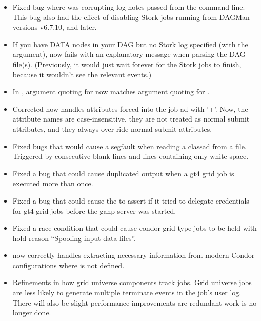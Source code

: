 \begin{itemize}
\item Fixed bug where  was corrupting log notes passed from the
command line.  This bug also had the effect of disabling Stork jobs running
from DAGMan versions v6.7.10, and later.

\item If you have DATA nodes in your DAG but no Stork log specified
(with the  argument),
 now fails with an explanatory message when parsing
the DAG file(s). (Previously, it would just wait forever for the Stork
jobs to finish, because it wouldn't see the relevant events.)

\item In , argument quoting for  now matches
argument quoting for .

\item Corrected how  handles attributes forced into the
job ad with '+'. Now, the attribute names are case-insensitive, they 
are not treated as normal submit attributes, and they always over-ride 
normal submit attributes.

\item Fixed bugs that would cause a segfault when reading a classad from
a file. Triggered by consecutive blank lines and lines containing only
white-space.

\item Fixed a bug that could cause duplicated output when a gt4 grid job 
is executed more than once.

\item Fixed a bug that could cause the  to assert if 
it tried to delegate credentials for gt4 grid jobs before the gahp server 
was started.

\item Fixed a race condition that could cause condor grid-type jobs to be
held with hold reason ``Spooling input data files''.

\item {} now correctly handles extracting necessary
information from modern Condor configurations where
 is not defined.

\item Refinements in how grid universe components track jobs.  Grid universe
jobs are less likely to generate multiple terminate events in the job's user
log.  There will also be slight performance improvements are redundant work 
is no longer done.


\end{itemize}
